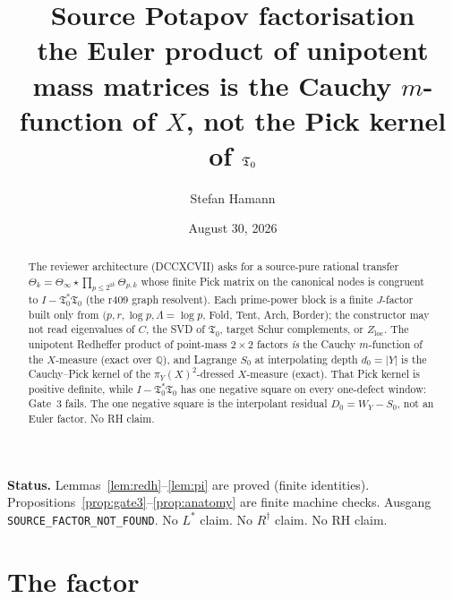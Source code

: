 \documentclass[11pt]{article}
\title{\bfseries Source Potapov factorisation\\[2mm]
\large the Euler product of unipotent mass matrices
is the Cauchy $m$-function of $X$,
not the Pick kernel of $\Tfrak_0$}
\author{Stefan Hamann}
\date{August 30, 2026}
\theoremstyle{remark}
\newcommand{\Tfrak}{\mathfrak{T}}
\newcommand{\redh}{\mathbin{\star}}
\begin{document}
\maketitle

\begin{abstract}\noindent
The reviewer architecture (DCCXCVII) asks for a
source-pure rational transfer
$\Theta_k=\Theta_\infty\redh\prod_{p\le 2^{2k}}\Theta_{p,k}$
whose finite Pick matrix on the canonical nodes is
congruent to $I-\Tfrak_0^*\Tfrak_0$ (the r409 graph
resolvent).
Each prime-power block is a finite $J$-factor built
only from $(p,r,\log p,\Lambda=\log p$, Fold, Tent,
Arch, Border); the constructor may not read eigenvalues
of $C$, the SVD of $\Tfrak_0$, target Schur complements,
or $Z_{\mathrm{loc}}$.
The unipotent Redheffer product of point-mass $2\times 2$
factors \emph{is} the Cauchy $m$-function of the
$X$-measure (exact over $\mathbb{Q}$), and Lagrange $S_0$
at interpolating depth $d_0=|Y|$ is the Cauchy--Pick
kernel of the $\pi_Y(X)^2$-dressed $X$-measure (exact).
That Pick kernel is positive definite, while
$I-\Tfrak_0^*\Tfrak_0$ has one negative square on every
one-defect window: Gate~3 fails.
The one negative square is the interpolant residual
$D_0=W_Y-S_0$, not an Euler factor.
No RH claim.
\end{abstract}

\medskip\noindent
\textbf{Status.}\enspace
Lemmas~\ref{lem:redh}--\ref{lem:pi} are proved (finite
identities).
Propositions~\ref{prop:gate3}--\ref{prop:anatomy} are
finite machine checks.
Ausgang \texttt{SOURCE\_FACTOR\_NOT\_FOUND}.
No $L^*$ claim.  No $R^\dagger$ claim.  No RH claim.

\section{The factor}\label{sec:def}
\end{document}
